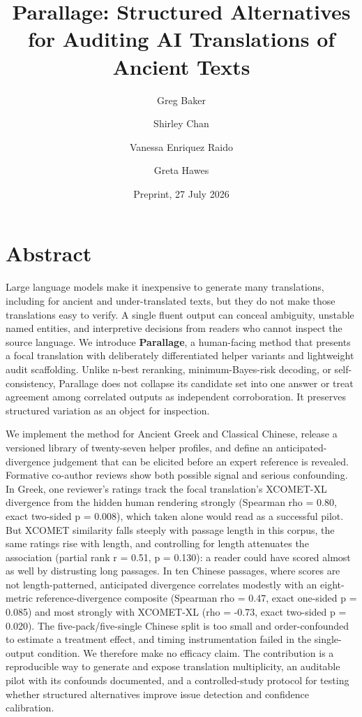 \documentclass[
  12pt,
]{article}
\title{Parallage: Structured Alternatives for Auditing AI Translations
of Ancient Texts}
\author{Greg Baker \and Shirley Chan \and Vanessa Enriquez
Raido \and Greta Hawes}
\date{Preprint, 27 July 2026}
\begin{document}
\maketitle

\section{Abstract}\label{abstract}

Large language models make it inexpensive to generate many translations,
including for ancient and under-translated texts, but they do not make
those translations easy to verify. A single fluent output can conceal
ambiguity, unstable named entities, and interpretive decisions from
readers who cannot inspect the source language. We introduce
\textbf{Parallage}, a human-facing method that presents a focal
translation with deliberately differentiated helper variants and
lightweight audit scaffolding. Unlike n-best reranking,
minimum-Bayes-risk decoding, or self-consistency, Parallage does not
collapse its candidate set into one answer or treat agreement among
correlated outputs as independent corroboration. It preserves structured
variation as an object for inspection.

We implement the method for Ancient Greek and Classical Chinese, release
a versioned library of twenty-seven helper profiles, and define an
anticipated-divergence judgement that can be elicited before an expert
reference is revealed. Formative co-author reviews show both possible
signal and serious confounding. In Greek, one reviewer's ratings track
the focal translation's XCOMET-XL divergence from the hidden human
rendering strongly (Spearman rho = 0.80, exact two-sided p = 0.008),
which taken alone would read as a successful pilot. But XCOMET
similarity falls steeply with passage length in this corpus, the same
ratings rise with length, and controlling for length attenuates the
association (partial rank r = 0.51, p = 0.130): a reader could have
scored almost as well by distrusting long passages. In ten Chinese
passages, where scores are not length-patterned, anticipated divergence
correlates modestly with an eight-metric reference-divergence composite
(Spearman rho = 0.47, exact one-sided p = 0.085) and most strongly with
XCOMET-XL (rho = -0.73, exact two-sided p = 0.020). The
five-pack/five-single Chinese split is too small and order-confounded to
estimate a treatment effect, and timing instrumentation failed in the
single-output condition. We therefore make no efficacy claim. The
contribution is a reproducible way to generate and expose translation
multiplicity, an auditable pilot with its confounds documented, and a
controlled-study protocol for testing whether structured alternatives
improve issue detection and confidence calibration.
\end{document}
